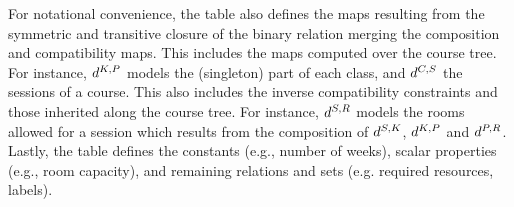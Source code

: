 For notational convenience, 
the table also defines 
the maps resulting from 
the symmetric and transitive closure of the binary relation %
merging the composition and compatibility maps.
This includes
the maps
computed over the course tree.
For instance, 
${d^{K,P}}$ 
models the (singleton) part of each class,
and ${d^{C,S}}$ 
the sessions of a course.
This also includes the 
inverse compatibility constraints
and those inherited along the course tree.
For instance, ${d^{S,R}}$ models the rooms allowed for a session
which results from the composition of ${d^{S,K}}$, ${d^{K,P}}$ and ${d^{P,R}}$.
Lastly, the table defines the constants (e.g., number of weeks),
scalar properties
(e.g., room capacity),
and remaining relations and sets (e.g. required resources, labels).



